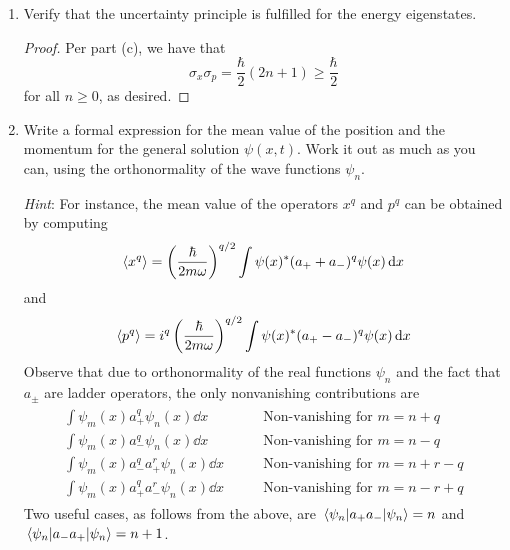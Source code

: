 \documentclass[../psets.tex]{subfiles}
\begin{document}
\begin{enumerate}
\begin{enumerate}
\begin{proof}
\begin{align*}
                \sigma_x^2 &= \ev{\hat{\vec{x}}{\,}^2}{\psi_n}-(\ev{\hat{\vec{x}}}{\psi_n})^2&
                \sigma_p^2 &= \ev{\hat{\vec{p}}{\,}^2}{\psi_n}-(\ev{\hat{\vec{p}}\,}{\psi_n})^2
            \end{align*}
            we have that
            \begin{align*}
                \sigma_x^2\cdot\sigma_p^2 &= \hbar^2\left( n+\frac{1}{2} \right)^2\\
                \Aboxed{\sigma_x\sigma_p &= \frac{\hbar}{2}(2n+1)}
            \end{align*}
        \end{proof}
        \item Verify that the uncertainty principle is fulfilled for the energy eigenstates.
        \begin{proof}
            Per part (c), we have that
            \begin{equation*}
                \sigma_x\sigma_p = \frac{\hbar}{2}(2n+1)
                \geq \frac{\hbar}{2}
            \end{equation*}
            for all $n\geq 0$, as desired.
        \end{proof}
        \item Write a formal expression for the mean value of the position and the momentum for the general solution $\psi(x,t)$. Work it out as much as you can, using the orthonormality of the wave functions $\psi_n$.\par
        \emph{Hint}: For instance, the mean value of the operators $x^q$ and $p^q$ can be obtained by computing
        \begin{equation}
            \langle{x^q}\rangle = \left( \frac{\hbar}{2m\omega} \right)^{q/2}\int\psi(x)^*(a_++a_-)^q\psi(x)\dd{x}
        \end{equation}
        and
        \begin{equation}
            \langle{p^q}\rangle = i^q\left( \frac{\hbar}{2m\omega} \right)^{q/2}\int\psi(x)^*(a_+-a_-)^q\psi(x)\dd{x}
        \end{equation}
        Observe that due to orthonormality of the real functions $\psi_n$ and the fact that $a_\pm$ are ladder operators, the only nonvanishing contributions are
        \begin{align}
            \begin{split}
                \int\psi_m(x)a_+^q\psi_n(x)\dd{x} &\qquad \text{Non-vanishing for }m=n+q\\
                \int\psi_m(x)a_-^q\psi_n(x)\dd{x} &\qquad \text{Non-vanishing for }m=n-q\\
                \int\psi_m(x)a_-^qa_+^r\psi_n(x)\dd{x} &\qquad \text{Non-vanishing for }m=n+r-q\\
                \int\psi_m(x)a_+^qa_-^r\psi_n(x)\dd{x} &\qquad \text{Non-vanishing for }m=n-r+q
            \end{split}
        \end{align}
        Two useful cases, as follows from the above, are $\ev{a_+a_-}{\psi_n}=n$ and $\ev{a_-a_+}{\psi_n}=n+1$.
    \end{enumerate}
\end{enumerate}
\end{document}
